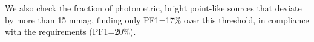 \documentclass[\docopts]{\docclass}
\begin{document}



We also check the fraction of photometric, bright point-like sources that deviate by more than 15 mmag, finding only PF1=17\% over this threshold, in compliance with the requirements (PF1=20\%).
\end{document}
